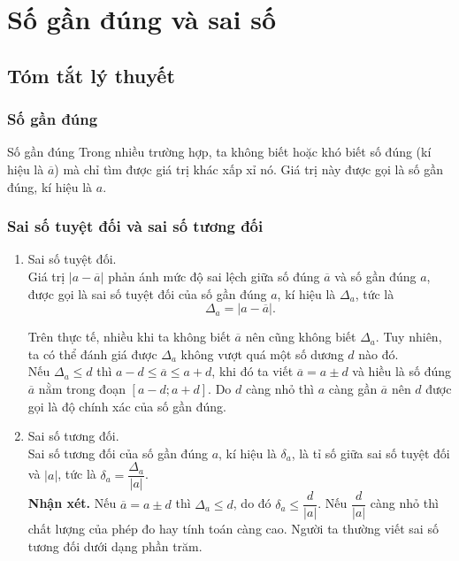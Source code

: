 \section{Số gần đúng và sai số}
\subsection{Tóm tắt lý thuyết}
\subsubsection{Số gần đúng}
	\begin{dn}{Số gần đúng}
		Trong nhiều trường hợp, ta không biết hoặc khó biết số đúng (kí hiệu là $\overline{a}$) mà chỉ tìm được giá trị khác xấp xỉ nó. Giá trị này được gọi là số gần đúng, kí hiệu là $a$.
	\end{dn}
\subsubsection{Sai số tuyệt đối và sai số tương đối}
\begin{enumerate}
	\item Sai số tuyệt đối.\\
	Giá trị $|a-\overline{a}|$ phản ánh mức độ sai lệch giữa số đúng $\overline{a}$ và số gần đúng $a$, được gọi là sai số tuyệt đối của số gần đúng $a$, kí hiệu là $\Delta_a$, tức là \[\Delta_a=|a-\overline{a}|.\]
	\begin{note}
		Trên thực tế, nhiều khi ta không biết $\overline{a}$ nên cũng không biết $\Delta_a$. Tuy nhiên, ta có thể đánh giá được $\Delta_a$ không vượt quá một số dương $d$ nào đó.\\
		Nếu $\Delta_{a} \leq d$ thì $a-d \le \overline{a} \le a+d$, khi đó ta viết $\overline{a}=a \pm d$ và hiều là số đúng $\overline{a}$ nằm trong đoạn $[a-d; a+d]$. Do $d$ càng nhỏ thì $a$ càng gần $\overline{a}$ nên $d$ được gọi là độ chính xác của số gần đúng.
	\end{note}
	\item Sai số tương đối.\\
		Sai số tương đối của số gần đúng $a$, kí hiệu là $\delta_a$, là tỉ số giữa sai số tuyệt đối và $|a|$, tức là $\delta_{a}=\dfrac{\Delta_a}{|a|}$.\\	
		\textbf{Nhận xét.} Nếu $\overline{a}=a \pm d$ thì $\Delta_a \leq d$, do đó $\delta_a \leq \dfrac{d}{|a|}$. Nếu $\dfrac{d}{|a|}$ càng nhỏ thì chất lượng của phép đo hay tính toán càng cao. Người ta thường viết sai số tương đối dưới dạng phần trăm.				
\end{enumerate}

